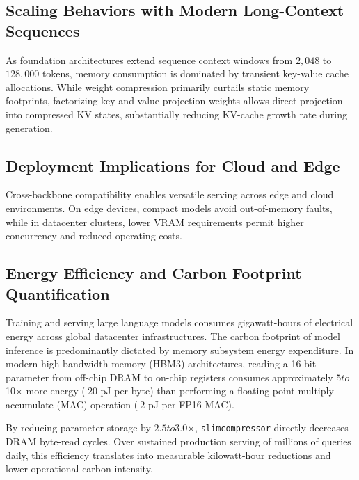\subsection{Scaling Behaviors with Modern Long-Context Sequences}
As foundation architectures extend sequence context windows from $2{,}048$ to $128{,}000$ tokens, memory consumption is dominated by transient key-value cache allocations. While weight compression primarily curtails static memory footprints, factorizing key and value projection weights allows direct projection into compressed KV states, substantially reducing KV-cache growth rate during generation.

\subsection{Deployment Implications for Cloud and Edge}
Cross-backbone compatibility enables versatile serving across edge and cloud environments. On edge devices, compact models avoid out-of-memory faults, while in datacenter clusters, lower VRAM requirements permit higher concurrency and reduced operating costs.

\subsection{Energy Efficiency and Carbon Footprint Quantification}
Training and serving large language models consumes gigawatt-hours of electrical energy across global datacenter infrastructures. The carbon footprint of model inference is predominantly dictated by memory subsystem energy expenditure. In modern high-bandwidth memory (HBM3) architectures, reading a 16-bit parameter from off-chip DRAM to on-chip registers consumes approximately $5$\times$ to $10$\times$ more energy ($~20$ pJ per byte) than performing a floating-point multiply-accumulate (MAC) operation ($~2$ pJ per FP16 MAC).

By reducing parameter storage by $2.5$\times$ to $3.0$\times$, \texttt{slimcompressor} directly decreases DRAM byte-read cycles. Over sustained production serving of millions of queries daily, this efficiency translates into measurable kilowatt-hour reductions and lower operational carbon intensity.

